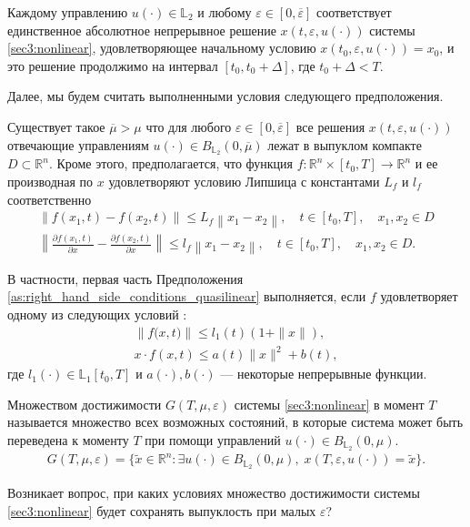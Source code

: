 \documentclass[../main.tex]{subfiles}
\begin{document}
Каждому управлению $u(\cdot) \in \mathbb{L}_2$ и любому $\varepsilon \in [0,\overline{\varepsilon}]$ соответствует единственное абсолютное непрерывное решение $ x(t,\varepsilon, u(\cdot)) $ системы \eqref{sec3:nonlinear}, удовлетворяющее начальному условию $ x(t_0,\varepsilon, u(\cdot)) = x_0$, и это решение продолжимо на интервал $[t_0, t_0 + \Delta]$, где $t_0 + \Delta < T$. 

Далее, мы будем считать выполненными условия следующего предположения.
\begin{assumption}\label{as:right_hand_side_conditions_quasilinear}
    
    Существует такое $\overline{\mu} > \mu $ что для любого $\varepsilon \in [0, \overline{\varepsilon}] $ все решения $ x(t,\varepsilon, u(\cdot)) $ отвечающие управлениям $u(\cdot) \in B_{\mathbb{L}_2}(0,\overline{\mu})$  лежат в выпуклом компакте $D \subset \mathbb{R}^n$.
    Кроме этого, предполагается, что функция $f: \mathbb{R}^n \times [t_0,T] \to \mathbb{R}^n$ и ее производная по $x$ удовлетворяют условию Липшица с константами $L_f$ и $l_f$ соответственно
    \begin{gather*}
        \left\| f(x_1,t) - f(x_2,t) \right\| \leqslant L_f \left\| x_1 - x_2 \right\|, \quad t\in[t_0,T], \quad x_1, x_2 \in D\\
        \left\| \frac{\partial f(x_1,t)}{\partial x} - \frac{\partial f(x_2,t)}{\partial x} \right\| \leqslant l_f \left\| x_1 - x_2 \right\|, \quad t\in[t_0,T], \quad x_1, x_2 \in D.
    \end{gather*}
\end{assumption} 

В частности, первая часть Предположения \ref{as:right_hand_side_conditions_quasilinear} выполняется, если  $f$ удовлетворяет одному из следующих условий \cite{Fillipov2}:
\begin{gather}\label{sec3:sublinear_growth}
    \left\|f\big(x,t\big) \right\| \leqslant l_1(t) (1 + \|x\|), \\ 
    x \cdot f(x,t) \leqslant a(t) \|x\|^2 + b(t),
\end{gather}
где $l_1(\cdot) \in \mathbb{L}_1[t_0,T]$ и $a(\cdot), b(\cdot)$ --- некоторые непрерывные функции.

\begin{definition} 
    Множеством достижимости $G(T,\mu,\varepsilon) $ системы \eqref{sec3:nonlinear} в момент $T$ называется множество всех возможных состояний, в которые система может быть переведена  к моменту $T$ при помощи управлений  $ u(\cdot) \in B_{\mathbb{L}_2}(0,\mu) $.
    \begin{gather*}
        G(T,\mu,\varepsilon) =\{\widetilde{x}\in \mathbb{R}^n:\exists u(\cdot)\in B_{\mathbb{L}_2}(0,\mu),\; x(T,\varepsilon,u(\cdot)) = \widetilde{x}\}.
    \end{gather*}
\end{definition} 
Возникает вопрос, при каких условиях множество достижимости системы \eqref{sec3:nonlinear} будет сохранять выпуклость при малых $\varepsilon$?
\end{document}
